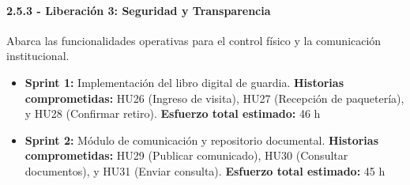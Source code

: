 \paragraph{2.5.3 - Liberación 3: Seguridad y Transparencia}

Abarca las funcionalidades operativas para el control físico y la comunicación institucional.
\begin{itemize}
    \item \textbf{Sprint 1:} Implementación del libro digital de guardia.  
    \textbf{Historias comprometidas:} HU26 (Ingreso de visita), HU27 (Recepción de paquetería), y HU28 (Confirmar retiro).  
    \textbf{Esfuerzo total estimado:} 46 h
    
    \item \textbf{Sprint 2:} Módulo de comunicación y repositorio documental.  
    \textbf{Historias comprometidas:} HU29 (Publicar comunicado), HU30 (Consultar documentos), y HU31 (Enviar consulta).  
    \textbf{Esfuerzo total estimado:} 45 h
\end{itemize}
